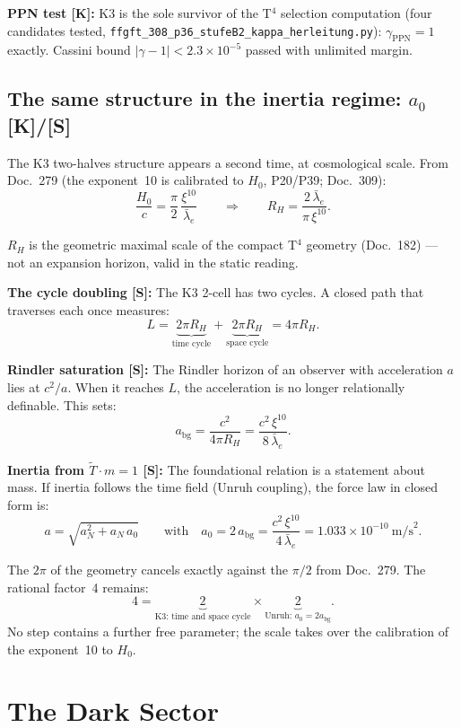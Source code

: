 \textbf{PPN test [K]:} K3 is the sole survivor of the T$^4$ selection
computation (four candidates tested,
\texttt{ffgft\_308\_p36\_stufeB2\_kappa\_herleitung.py}):
$\gamma_\text{PPN} = 1$ exactly. Cassini bound
$|\gamma - 1| < 2.3\times10^{-5}$ passed with unlimited margin.

\section{The same structure in the inertia regime: $a_0$ [K]/[S]}

The K3 two-halves structure appears a second time, at cosmological scale.
From Doc.~279 (the exponent~10 is calibrated to $H_0$, P20/P39; Doc.~309):
\[
  \frac{H_0}{c} = \frac{\pi}{2}\,\frac{\xi^{10}}{\bar\lambda_e}
  \qquad\Longrightarrow\qquad
  R_H = \frac{2\,\bar\lambda_e}{\pi\,\xi^{10}}.
\]

$R_H$ is the geometric maximal scale of the compact T$^4$ geometry
(Doc.~182) — not an expansion horizon, valid in the static reading.

\textbf{The cycle doubling [S]:} The K3 2-cell has two cycles. A closed
path that traverses each once measures:
\[
  L = \underbrace{2\pi R_H}_{\text{time cycle}}
    + \underbrace{2\pi R_H}_{\text{space cycle}}
    = 4\pi R_H .
\]

\textbf{Rindler saturation [S]:} The Rindler horizon of an observer with
acceleration $a$ lies at $c^2/a$. When it reaches $L$, the acceleration is
no longer relationally definable. This sets:
\[
  a_\text{bg} = \frac{c^2}{4\pi R_H}
              = \frac{c^2\,\xi^{10}}{8\,\bar\lambda_e}.
\]

\textbf{Inertia from $\tilde T \cdot m = 1$ [S]:} The foundational relation
is a statement about mass. If inertia follows the time field (Unruh
coupling), the force law in closed form is:
\[
  \boxed{a = \sqrt{a_N^2 + a_N\,a_0}}
  \qquad\text{with}\quad
  a_0 = 2\,a_\text{bg}
      = \frac{c^2\,\xi^{10}}{4\,\bar\lambda_e}
      = 1.033\times10^{-10}~\text{m/s}^2.
\]

The $2\pi$ of the geometry cancels exactly against the $\pi/2$ from
Doc.~279. The rational factor~4 remains:
\[
  4 = \underbrace{2}_{\text{K3: time and space cycle}}
    \times
    \underbrace{2}_{\text{Unruh: }a_0 = 2a_\text{bg}}.
\]
No step contains a further free parameter; the scale takes over the
calibration of the exponent~10 to $H_0$.

\chapter{The Dark Sector}

